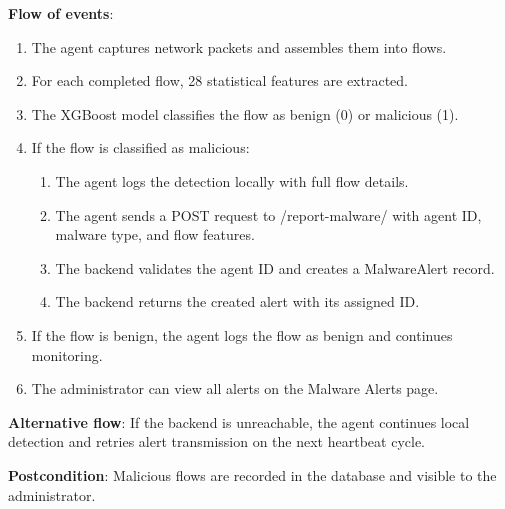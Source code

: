 \documentclass[../Main.tex]{subfiles}
\begin{document}
\textbf{Flow of events}:
\begin{enumerate}
    \item The agent captures network packets and assembles them into flows.
    \item For each completed flow, 28 statistical features are extracted.
    \item The XGBoost model classifies the flow as benign (0) or malicious (1).
    \item If the flow is classified as malicious:
    \begin{enumerate}
        \item The agent logs the detection locally with full flow details.
        \item The agent sends a POST request to /report-malware/ with agent ID, malware type, and flow features.
        \item The backend validates the agent ID and creates a MalwareAlert record.
        \item The backend returns the created alert with its assigned ID.
    \end{enumerate}
    \item If the flow is benign, the agent logs the flow as benign and continues monitoring.
    \item The administrator can view all alerts on the Malware Alerts page.
\end{enumerate}

\textbf{Alternative flow}: If the backend is unreachable, the agent continues local detection and retries alert transmission on the next heartbeat cycle.

\textbf{Postcondition}: Malicious flows are recorded in the database and visible to the administrator.
\end{document}
